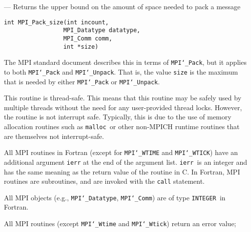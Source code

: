 \startmanpage
{}
--- Returns the upper bound on the amount of space needed to pack a message 
\startvb\begin{verbatim}
int MPI_Pack_size(int incount,
                 MPI_Datatype datatype,
                 MPI_Comm comm,
                 int *size)

\end{verbatim}
\endvb

\par
{}
\par
{}
The MPI standard document describes this in terms of {\tt MPI{\tt \char`\_}Pack}, but it
applies to both {\tt MPI{\tt \char`\_}Pack} and {\tt MPI{\tt \char`\_}Unpack}.  That is, the value {\tt size} is
the maximum that is needed by either {\tt MPI{\tt \char`\_}Pack} or {\tt MPI{\tt \char`\_}Unpack}.
\par
{}
\par
This routine is thread-safe.  This means that this routine may be
safely used by multiple threads without the need for any user-provided
thread locks.  However, the routine is not interrupt safe.  Typically,
this is due to the use of memory allocation routines such as {\tt malloc
}or other non-MPICH runtime routines that are themselves not interrupt-safe.
\par
{}
All MPI routines in Fortran (except for {\tt MPI{\tt \char`\_}WTIME} and {\tt MPI{\tt \char`\_}WTICK}) have
an additional argument {\tt ierr} at the end of the argument list.  {\tt ierr
}is an integer and has the same meaning as the return value of the routine
in C.  In Fortran, MPI routines are subroutines, and are invoked with the
{\tt call} statement.
\par
All MPI objects (e.g., {\tt MPI{\tt \char`\_}Datatype}, {\tt MPI{\tt \char`\_}Comm}) are of type {\tt INTEGER
}in Fortran.
\par
{}
\par
All MPI routines (except {\tt MPI{\tt \char`\_}Wtime} and {\tt MPI{\tt \char`\_}Wtick}) return an error value;

